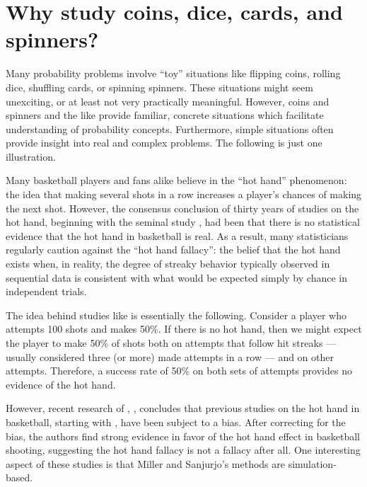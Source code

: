 \documentclass[
]{book}
\theoremstyle{definition}
\theoremstyle{definition}
\theoremstyle{definition}
\theoremstyle{remark}
\begin{document}
\hypertarget{why-study-coins-dice-cards-and-spinners}{%
\section{Why study coins, dice, cards, and spinners?}\label{why-study-coins-dice-cards-and-spinners}}

Many probability problems involve ``toy'' situations like flipping coins, rolling dice, shuffling cards, or spinning spinners. These situations might seem unexciting, or at least not very practically meaningful. However, coins and spinners and the like provide familiar, concrete situations which facilitate understanding of probability concepts. Furthermore, simple situations often provide insight into real and complex problems. The following is just one illustration.

Many basketball players and fans alike believe in the ``hot hand''
phenomenon: the idea that making several shots in a row increases a
player's chances of making the next shot. However, the consensus
conclusion of thirty years of studies on the hot hand, beginning with
the seminal study \citet{GVT}, had been that there is
no statistical evidence that the hot hand in basketball is real. As a
result, many statisticians regularly caution against the ``hot hand
fallacy'': the belief that the hot hand exists when, in reality, the
degree of streaky behavior typically observed in sequential data is
consistent with what would be expected simply by chance in independent
trials.

The idea behind studies like \citet{GVT} is essentially the
following. Consider a player who attempts 100 shots and makes 50\%. If
there is no hot hand, then we might expect the player to make 50\% of
shots both on attempts that follow hit streaks --- usually considered
three (or more) made attempts in a row --- and on other attempts.
Therefore, a success rate of 50\% on both sets of attempts provides no
evidence of the hot hand.

However, recent research of \citet{MStruth}, \citet{MSthree}, \citet{MScold} concludes that previous studies on the hot hand in basketball,
starting with \citet{GVT}, have been subject to a bias. After
correcting for the bias, the authors find strong evidence in favor of
the hot hand effect in basketball shooting, suggesting the hot hand
fallacy is not a fallacy after all. One interesting aspect of these
studies is that Miller and Sanjurjo's methods are simulation-based.
\end{document}
